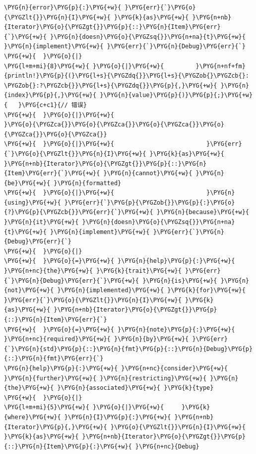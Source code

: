 \begin{Verbatim}[commandchars=\\\{\},breaklines=true,breakanywhere=true,fontsize=\codefont,xleftmargin=17bp]
\PYG{n}{error}\PYG{p}{:}\PYG{+w}{ }\PYG{err}{`}\PYG{o}{\PYGZlt{}}\PYG{n}{I}\PYG{+w}{ }\PYG{k}{as}\PYG{+w}{ }\PYG{n+nb}{Iterator}\PYG{o}{\PYGZgt{}}\PYG{p}{::}\PYG{n}{Item}\PYG{err}{`}\PYG{+w}{ }\PYG{n}{doesn}\PYG{o}{\PYGZsq{}}\PYG{n+na}{t}\PYG{+w}{ }\PYG{n}{implement}\PYG{+w}{ }\PYG{err}{`}\PYG{n}{Debug}\PYG{err}{`}
\PYG{+w}{  }\PYG{o}{|}
\PYG{l+m+mi}{8}\PYG{+w}{ }\PYG{o}{|}\PYG{+w}{         }\PYG{n+nf+fm}{println!}\PYG{p}{(}\PYG{l+s}{\PYGZdq{}}\PYG{l+s}{\PYGZob{}\PYGZcb{}: \PYGZob{}:?\PYGZcb{}}\PYG{l+s}{\PYGZdq{}}\PYG{p}{,}\PYG{+w}{ }\PYG{n}{index}\PYG{p}{,}\PYG{+w}{ }\PYG{n}{value}\PYG{p}{)}\PYG{p}{;}\PYG{+w}{   }\PYG{c+c1}{// 错误}
\PYG{+w}{  }\PYG{o}{|}\PYG{+w}{                                     }\PYG{o}{\PYGZca{}}\PYG{o}{\PYGZca{}}\PYG{o}{\PYGZca{}}\PYG{o}{\PYGZca{}}\PYG{o}{\PYGZca{}}
\PYG{+w}{  }\PYG{o}{|}\PYG{+w}{                          }\PYG{err}{`}\PYG{o}{\PYGZlt{}}\PYG{n}{I}\PYG{+w}{ }\PYG{k}{as}\PYG{+w}{ }\PYG{n+nb}{Iterator}\PYG{o}{\PYGZgt{}}\PYG{p}{::}\PYG{n}{Item}\PYG{err}{`}\PYG{+w}{ }\PYG{n}{cannot}\PYG{+w}{ }\PYG{n}{be}\PYG{+w}{ }\PYG{n}{formatted}
\PYG{+w}{  }\PYG{o}{|}\PYG{+w}{                          }\PYG{n}{using}\PYG{+w}{ }\PYG{err}{`}\PYG{p}{\PYGZob{}}\PYG{p}{:}\PYG{o}{?}\PYG{p}{\PYGZcb{}}\PYG{err}{`}\PYG{+w}{ }\PYG{n}{because}\PYG{+w}{ }\PYG{n}{it}\PYG{+w}{ }\PYG{n}{doesn}\PYG{o}{\PYGZsq{}}\PYG{n+na}{t}\PYG{+w}{ }\PYG{n}{implement}\PYG{+w}{ }\PYG{err}{`}\PYG{n}{Debug}\PYG{err}{`}
\PYG{+w}{  }\PYG{o}{|}
\PYG{+w}{  }\PYG{o}{=}\PYG{+w}{ }\PYG{n}{help}\PYG{p}{:}\PYG{+w}{ }\PYG{n+nc}{the}\PYG{+w}{ }\PYG{k}{trait}\PYG{+w}{ }\PYG{err}{`}\PYG{n}{Debug}\PYG{err}{`}\PYG{+w}{ }\PYG{n}{is}\PYG{+w}{ }\PYG{n}{not}\PYG{+w}{ }\PYG{n}{implemented}\PYG{+w}{ }\PYG{k}{for}\PYG{+w}{ }\PYG{err}{`}\PYG{o}{\PYGZlt{}}\PYG{n}{I}\PYG{+w}{ }\PYG{k}{as}\PYG{+w}{ }\PYG{n+nb}{Iterator}\PYG{o}{\PYGZgt{}}\PYG{p}{::}\PYG{n}{Item}\PYG{err}{`}
\PYG{+w}{  }\PYG{o}{=}\PYG{+w}{ }\PYG{n}{note}\PYG{p}{:}\PYG{+w}{ }\PYG{n+nc}{required}\PYG{+w}{ }\PYG{n}{by}\PYG{+w}{ }\PYG{err}{`}\PYG{n}{std}\PYG{p}{::}\PYG{n}{fmt}\PYG{p}{::}\PYG{n}{Debug}\PYG{p}{::}\PYG{n}{fmt}\PYG{err}{`}
\PYG{n}{help}\PYG{p}{:}\PYG{+w}{ }\PYG{n+nc}{consider}\PYG{+w}{ }\PYG{n}{further}\PYG{+w}{ }\PYG{n}{restricting}\PYG{+w}{ }\PYG{n}{the}\PYG{+w}{ }\PYG{n}{associated}\PYG{+w}{ }\PYG{k}{type}
\PYG{+w}{  }\PYG{o}{|}
\PYG{l+m+mi}{5}\PYG{+w}{ }\PYG{o}{|}\PYG{+w}{     }\PYG{k}{where}\PYG{+w}{ }\PYG{n}{I}\PYG{p}{:}\PYG{+w}{ }\PYG{n+nb}{Iterator}\PYG{p}{,}\PYG{+w}{ }\PYG{o}{\PYGZlt{}}\PYG{n}{I}\PYG{+w}{ }\PYG{k}{as}\PYG{+w}{ }\PYG{n+nb}{Iterator}\PYG{o}{\PYGZgt{}}\PYG{p}{::}\PYG{n}{Item}\PYG{p}{:}\PYG{+w}{ }\PYG{n+nc}{Debug}

\end{Verbatim}
